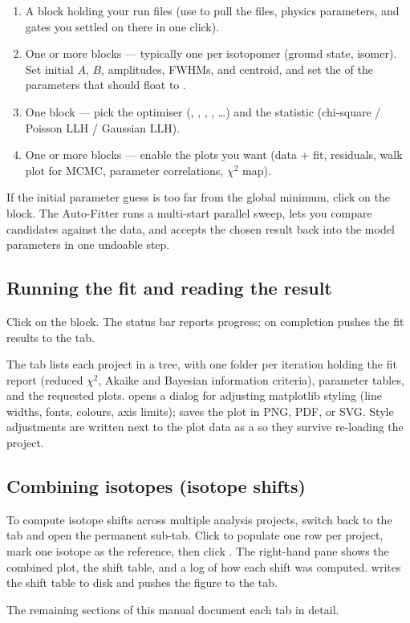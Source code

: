 \begin{enumerate}
    \item A  block holding your run files (use
         to pull the files, physics
        parameters, and gates you settled on there in one click).
    \item One or more  blocks --- typically one per
        isotopomer (ground state, isomer). Set initial $A$, $B$,
        amplitudes, FWHMs, and centroid, and set the  of
        the parameters that should float to .
    \item One  block --- pick the optimiser
        (, , ,
        , \dots) and the statistic (chi-square / Poisson
        LLH / Gaussian LLH).
    \item One or more  blocks --- enable the plots you
        want (data + fit, residuals, walk plot for MCMC, parameter
        correlations, $\chi^2$ map).
\end{enumerate}

If the initial parameter guess is too far from the global minimum,
click  on the  block. The
Auto-Fitter runs a multi-start parallel  sweep, lets
you compare candidates against the data, and accepts the chosen
result back into the model parameters in one undoable step.

\subsection{Running the fit and reading the result}

Click  on the  block. The status bar
reports progress; on completion \denis{} pushes the fit results to
the  tab.

The  tab lists each project in a tree, with one folder
per iteration holding the fit report (reduced $\chi^2$, Akaike and
Bayesian information criteria), parameter tables, and the requested
plots.  opens a dialog for adjusting matplotlib
styling (line widths, fonts, colours, axis limits); 
saves the plot in PNG, PDF, or SVG. Style adjustments are written
next to the plot data as a  so they survive
re-loading the project.

\subsection{Combining isotopes (isotope shifts)}

To compute isotope shifts across multiple analysis projects, switch
back to the  tab and open the permanent
 sub-tab. Click  to
populate one row per project, mark one isotope as the reference, then
click . The right-hand pane shows the combined
plot, the shift table, and a log of how each shift was computed.
 writes the shift table to disk and
 pushes the figure to the  tab.

\bigskip

The remaining sections of this manual document each tab in detail.
